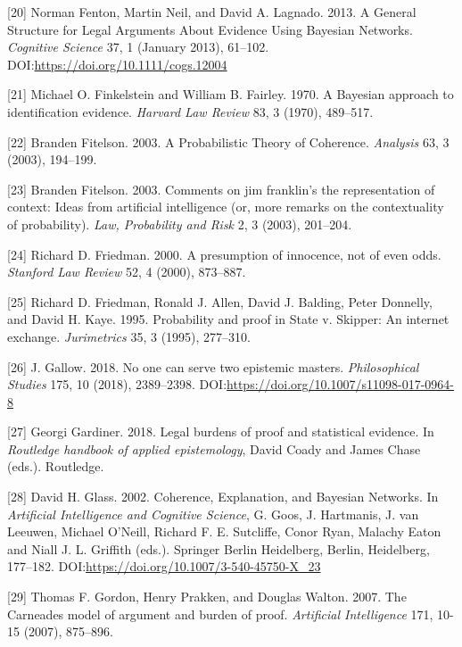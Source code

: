 \documentclass[11pt,dvipsnames,enabledeprecatedfontcommands]{scrartcl}
\begin{document}
\hypertarget{ref-fenton2013GeneralStructureLegal}{}
{[}20{]} Norman Fenton, Martin Neil, and David A. Lagnado. 2013. A
General Structure for Legal Arguments About Evidence Using Bayesian
Networks. \emph{Cognitive Science} 37, 1 (January 2013), 61--102.
DOI:\url{https://doi.org/10.1111/cogs.12004}

\hypertarget{ref-Finkelstein1970A}{}
{[}21{]} Michael O. Finkelstein and William B. Fairley. 1970. A Bayesian
approach to identification evidence. \emph{Harvard Law Review} 83, 3
(1970), 489--517.

\hypertarget{ref-fitelson2003ProbabilisticTheoryCoherence}{}
{[}22{]} Branden Fitelson. 2003. A Probabilistic Theory of Coherence.
\emph{Analysis} 63, 3 (2003), 194--199.

\hypertarget{ref-fitelson2003comments}{}
{[}23{]} Branden Fitelson. 2003. Comments on jim franklin's the
representation of context: Ideas from artificial intelligence (or, more
remarks on the contextuality of probability). \emph{Law, Probability and
Risk} 2, 3 (2003), 201--204.

\hypertarget{ref-Friedman2000}{}
{[}24{]} Richard D. Friedman. 2000. A presumption of innocence, not of
even odds. \emph{Stanford Law Review} 52, 4 (2000), 873--887.

\hypertarget{ref-friedmanEtAl1995}{}
{[}25{]} Richard D. Friedman, Ronald J. Allen, David J. Balding, Peter
Donnelly, and David H. Kaye. 1995. Probability and proof in State v.
Skipper: An internet exchange. \emph{Jurimetrics} 35, 3 (1995),
277--310.

\hypertarget{ref-Gallow2018No}{}
{[}26{]} J. Gallow. 2018. No one can serve two epistemic masters.
\emph{Philosophical Studies} 175, 10 (2018), 2389--2398.
DOI:\url{https://doi.org/10.1007/s11098-017-0964-8}

\hypertarget{ref-gardiner2018}{}
{[}27{]} Georgi Gardiner. 2018. Legal burdens of proof and statistical
evidence. In \emph{Routledge handbook of applied epistemology}, David
Coady and James Chase (eds.). Routledge.

\hypertarget{ref-glass2002}{}
{[}28{]} David H. Glass. 2002. Coherence, Explanation, and Bayesian
Networks. In \emph{Artificial Intelligence and Cognitive Science}, G.
Goos, J. Hartmanis, J. van Leeuwen, Michael O'Neill, Richard F. E.
Sutcliffe, Conor Ryan, Malachy Eaton and Niall J. L. Griffith (eds.).
Springer Berlin Heidelberg, Berlin, Heidelberg, 177--182.
DOI:\url{https://doi.org/10.1007/3-540-45750-X_23}

\hypertarget{ref-gordon2007}{}
{[}29{]} Thomas F. Gordon, Henry Prakken, and Douglas Walton. 2007. The
Carneades model of argument and burden of proof. \emph{Artificial
Intelligence} 171, 10-15 (2007), 875--896.
\end{document}
